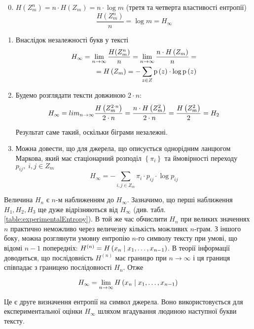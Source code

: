\begin{enumerate}[label=\bfseries M\arabic*:]
    \setcounter{enumi}{-1}
    \item $H(Z_{m}^{n})=n\cdot H(Z_{m})=n\cdot \log{m}$
        (третя та четверта властивості ентропії)
        $$\frac{H(Z_{m}^{n})}{n}=\log{m}=H_{\infty}$$
    \item Внаслідок незалежності букв у тексті
        \begin{align*}
            H_\infty
                = \lim_{n\to\infty}\frac{H(Z_{m}^{n})}{n}
                = \lim_{n\to\infty}\frac{n \cdot H\left( Z_{m} \right)}{n} = \\
                = H\left( Z_{m} \right)
                = - \sum_{z \in Z} \mathrm{p}\left(z\right)\cdot \log{\mathrm{p}\left(z\right)}
        \end{align*}
    \item Будемо розглядати тексти довжиною $2 \cdot n$:
        $$H_\infty
            = lim_{n\to\infty}\frac{H\left( Z_{m}^{2 \cdot n} \right)}{2 \cdot n}
            =\frac{n \cdot H\left( Z_{m}^{2} \right)}{2 \cdot n}
            =\frac{H\left( Z_{m}^{2} \right)}{2}
            =H_2$$

        Результат саме такий, оскільки біграми незалежні.
    \item Можна довести, що для джерела, що описується однорідним ланцюгом
        Маркова, який має стаціонарний розподіл  $\left\{ \pi_{i} \right\}$
        та ймовірності переходу $p_{ij},\; i,j \in Z_{m}$
        $$H_\infty
            = - \sum_{i,j\in Z_m} \pi_{i} \cdot p_{ij} \cdot \log{p_{ij}}$$
\end{enumerate}

Величина  $H_n$ є  $n$-м наближенням до  $H_\infty$. Зазначимо,
що перші наближення  $H_1,H_2,H_3$ ще дуже відрізняються від 
$H_\infty$ (див. табл. \ref{table:experimentalEntropy}). В той же час обчислити
$H_n$ при великих значеннях  $n$ практично неможливо  через величезну кількість
можливих $n$-грам. З іншого боку, можна розглянути умовну ентропію 
$n$-го символу тексту при умові, що відомі  $n-1$ попередніх: 
$H^{\left( n \right)} = H\left( x_n \;\middle|\; x_1,\dots,x_{n-1} \right)$. В теорії
інформації доводиться, що послідовність  $H^{(n)}$ має границю при 
$n\rightarrow \infty$ і ця границя співпадає з границею послідовності $H_n$.
Отже

$$H_\infty
    = \lim_{n\rightarrow \infty} H\left( x_n \;\middle|\; x_1,\dots,x_{n-1} \right)$$

Це є друге визначення ентропії на символ джерела. Воно використовується для
експериментальної оцінки  $H_\infty$ шляхом вгадування людиною наступної
букви тексту.

